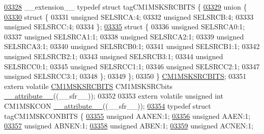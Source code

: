 \begin{DoxyCode}
\hypertarget{a00009_source_l03328}{}\hyperlink{a00008}{03328} \_\_extension\_\_ \textcolor{keyword}{typedef} \textcolor{keyword}{struct }tagCM1MSKSRCBITS \{
\hypertarget{a00009_source_l03329}{}\hyperlink{a00009}{03329}   \textcolor{keyword}{union }\{
\hypertarget{a00009_source_l03330}{}\hyperlink{a00009}{03330}     \textcolor{keyword}{struct }\{
03331       \textcolor{keywordtype}{unsigned} SELSRCA:4;
03332       \textcolor{keywordtype}{unsigned} SELSRCB:4;
03333       \textcolor{keywordtype}{unsigned} SELSRCC:4;
03334     \};
\hypertarget{a00009_source_l03335}{}\hyperlink{a00009}{03335}     \textcolor{keyword}{struct }\{
03336       \textcolor{keywordtype}{unsigned} SELSRCA0:1;
03337       \textcolor{keywordtype}{unsigned} SELSRCA1:1;
03338       \textcolor{keywordtype}{unsigned} SELSRCA2:1;
03339       \textcolor{keywordtype}{unsigned} SELSRCA3:1;
03340       \textcolor{keywordtype}{unsigned} SELSRCB0:1;
03341       \textcolor{keywordtype}{unsigned} SELSRCB1:1;
03342       \textcolor{keywordtype}{unsigned} SELSRCB2:1;
03343       \textcolor{keywordtype}{unsigned} SELSRCB3:1;
03344       \textcolor{keywordtype}{unsigned} SELSRCC0:1;
03345       \textcolor{keywordtype}{unsigned} SELSRCC1:1;
03346       \textcolor{keywordtype}{unsigned} SELSRCC2:1;
03347       \textcolor{keywordtype}{unsigned} SELSRCC3:1;
03348     \};
03349   \};
03350 \} \hyperlink{a00008_d1/de3/a00306}{CM1MSKSRCBITS};
03351 \textcolor{keyword}{extern} \textcolor{keyword}{volatile} \hyperlink{a00008_d1/de3/a00306}{CM1MSKSRCBITS} CM1MSKSRCbits \hyperlink{a00009_a493c46f03454991ccc5aa7a6e1dfb2a7}{\_\_attribute\_\_}((\_\_sfr\_\_));
03352 
03353 \textcolor{keyword}{extern} \textcolor{keyword}{volatile} \textcolor{keywordtype}{unsigned} \textcolor{keywordtype}{int}  CM1MSKCON \hyperlink{a00009_a493c46f03454991ccc5aa7a6e1dfb2a7}{\_\_attribute\_\_}((\_\_sfr\_\_));
\hypertarget{a00009_source_l03354}{}\hyperlink{a00008}{03354} \textcolor{keyword}{typedef} \textcolor{keyword}{struct }tagCM1MSKCONBITS \{
\hypertarget{a00009_source_l03355}{}\hyperlink{a00008_a6ea89b9cbdf0bbde3ec8147513e70fa0}{03355}   \textcolor{keywordtype}{unsigned} AANEN:1;
\hypertarget{a00009_source_l03356}{}\hyperlink{a00008_a58bba29325ff11212a73bae4b2b1a707}{03356}   \textcolor{keywordtype}{unsigned} AAEN:1;
\hypertarget{a00009_source_l03357}{}\hyperlink{a00008_a1b2c756ac7255e490499f85cb2d746f3}{03357}   \textcolor{keywordtype}{unsigned} ABNEN:1;
\hypertarget{a00009_source_l03358}{}\hyperlink{a00008_abae9997777bf70f8cf9132c18db1e83d}{03358}   \textcolor{keywordtype}{unsigned} ABEN:1;
\hypertarget{a00009_source_l03359}{}\hyperlink{a00008_af825e9ea0f6690d86c6ca9bda2e82eb1}{03359}   \textcolor{keywordtype}{unsigned} ACNEN:1;

\end{DoxyCode}
